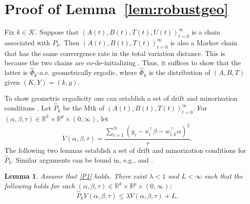 \documentclass[12pt]{article}
\newtheorem{lemma}[theorem]{Lemma}
\begin{document}
	
	
	
	
	\section{Proof of Lemma~\ref{lem:robustgeo}} \label{app:robustgeo}
	
	Fix $k \in \mathcal{K}$.
	Suppose that $(A(t), B(t), T(t), U(t))_{t=0}^{\infty}$ is a chain associated with $P_k$.
	Then $(A(t), B(t), T(t))_{t=0}^{\infty}$ is also a Markov chain that has the same convergence rate in the total variation distance.
	This is because the two chains are co-de-initializing \citep{roberts2001markov}.
	Thus, it suffices to show that the latter is $\hat{\Phi}_k$-a.e. geometrically ergodic, where $\hat{\Phi}_k$ is the distribution of $(A,B,T)$ given $(K,Y) = (k,y)$.
	
	
	To show geometric ergodicity one can establish a set of drift and minorization conditions \citep{rosenthal1995minorization}.
	Let $\hat{P}_k$ be the Mtk of $(A(t), B(t), T(t))_{t=0}^{\infty}$.
	For $(\alpha, \beta, \tau) \in \mathbb{R}^k \times \mathbb{R}^p \times (0,\infty)$, let
	\[
	V(\alpha, \beta, \tau) = \frac{\sum_{i=1}^N (y_i - x_i^{\top} \beta - w_{i,k}^{\top} \alpha)^2}{\tau}.
	\]
	The following two lemmas establish a set of drift and minorization conditions for $\hat{P}_k$.
	Similar arguments can be found in, e.g., \cite{roy2010monte} and \cite{hobert2015convergence}.
	
	\begin{lemma} \label{lem:robustdrift}
		Assume that \ref{P1} holds.
		There exist $\lambda < 1$ and $L < \infty$ such that the following holds for each $(\alpha, \beta, \tau) \in \mathbb{R}^k \times \mathbb{R}^p \times (0,\infty)$:
		\[
		\hat{P}_k V(\alpha, \beta, \tau) \leq \lambda V(\alpha, \beta, \tau) + L.
		\]
	\end{lemma}
	
\end{document}
